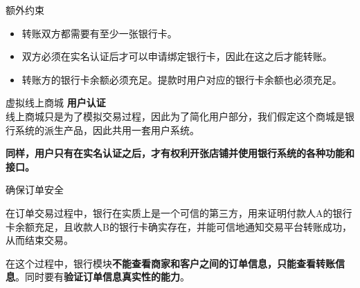 \documentclass[]{beamer}
\begin{document}
    
    

    \begin{frame}{额外约束}
        \begin{itemize}
            \item 转账双方都需要有至少一张银行卡。
            \item 双方必须在实名认证后才可以申请绑定银行卡，因此在这之后才能转账。
            \item 转账方的银行卡余额必须充足。提款时用户对应的银行卡余额也必须充足。
        \end{itemize}
    \end{frame}

    \begin{frame}{虚拟线上商城}
        \textbf{用户认证} \\
        线上商城只是为了模拟交易过程，因此为了简化用户部分，我们假定这个商城是银行系统的派生产品，因此共用一套用户系统。
    
        \vspace{1em} %
        
        \textbf{同样，用户只有在实名认证之后，才有权利开张店铺并使用银行系统的各种功能和接口。}
    \end{frame}
    
    \begin{frame}{确保订单安全}

        
        \begin{block}{}
            在订单交易过程中，银行在实质上是一个可信的第三方，用来证明付款人A的银行卡余额充足，且收款人B的银行卡确实存在，并能可信地通知交易平台转账成功，从而结束交易。
        \end{block}
    
        \vspace{1em} %
    
        在这个过程中，银行模块\textbf{不能查看商家和客户之间的订单信息，只能查看转账信息}。同时要有\textbf{验证订单信息真实性的能力}。
    
    \end{frame}
    
    
    
\end{document}
